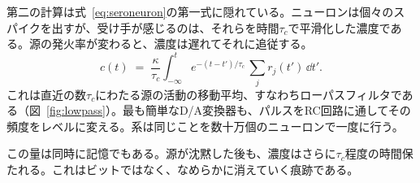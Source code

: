 第二の計算は式~\eqref{eq:seroneuron}の第一式に隠れている。ニューロンは個々のスパイクを出すが、受け手が感じるのは、それらを時間$\tau_c$で平滑化した濃度である。源の発火率が変わると、濃度は遅れてそれに追従する。
\begin{equation}
c(t) \;=\; \frac{\kappa}{\tau_c}\int_{-\infty}^{t} e^{-(t-t')/\tau_c}\,\sum_j r_j(t')\,\dd t' .
\label{eq:lowpass}
\end{equation}
これは直近の数$\tau_c$にわたる源の活動の移動平均、すなわちローパスフィルタである（図~\ref{fig:lowpass}）。最も簡単なD/A変換器も、パルスをRC回路に通してその頻度をレベルに変える。系は同じことを数十万個のニューロンで一度に行う。

この量は同時に記憶でもある。源が沈黙した後も、濃度はさらに$\tau_c$程度の時間保たれる。これはビットではなく、なめらかに消えていく痕跡である。

